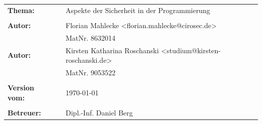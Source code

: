 \begin{verbatim}






\end{verbatim}
\begin{flushleft}
\begin{tabular}{llll}
\textbf{Thema:} & & Aspekte der Sicherheit in der Programmierung & \\
& & \\
\textbf{Autor:} & & Florian Mahlecke <florian.mahlecke@cirosec.de>& \\
& & MatNr. 8632014 & \\
\textbf{Autor:} & & Kirsten Katharina Roschanski <studium@kirsten-roschanski.de>& \\
& & MatNr. 9053522 & \\
& & \\
\textbf{Version vom:} & & \today &\\
& & \\
\textbf{Betreuer:} & & Dipl.-Inf. Daniel Berg &\\
\end{tabular}
\end{flushleft}
